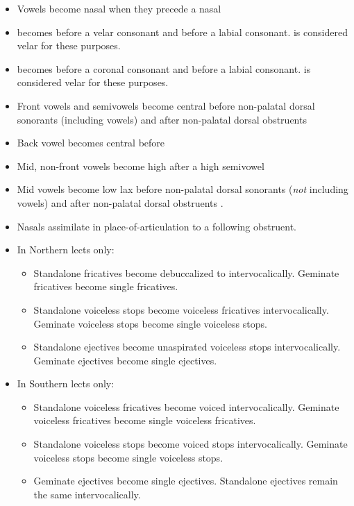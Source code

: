 \documentclass[a4paper,11pt,oneside,openany]{memoir}
\begin{document}
\begin{itemize}
    \item Vowels  become nasal  when they precede a nasal
    \item {} becomes \bripa{\vell} before a velar consonant and \bripa{\bilav\dwnwrd} before a labial consonant.  is considered velar for these purposes.
    \item \phipa{\vell} becomes \bripa{\darkl} before a coronal consonant and  before a labial consonant.  is considered velar for these purposes.
    \item Front vowels and semivowels  become central  before non-palatal dorsal sonorants (including vowels)  and after non-palatal dorsal obstruents 
    \item Back vowel  becomes central \bripa{\sche} before 
    \item Mid, non-front vowels  become high  after a high semivowel 
    \item Mid vowels  become low lax  before non-palatal dorsal sonorants (\emph{not} including vowels)  and after non-palatal dorsal obstruents .
    \item Nasals assimilate in place-of-articulation to a following obstruent.
    \item In Northern lects only:
    \begin{itemize}
        \item Standalone fricatives become debuccalized to  intervocalically. Geminate fricatives become single fricatives.
        \item Standalone voiceless stops become voiceless fricatives intervocalically. Geminate voiceless stops become single voiceless stops.
        \item Standalone ejectives become unaspirated voiceless stops intervocalically. Geminate ejectives become single ejectives.
    \end{itemize}
    \item In Southern lects only:
    \begin{itemize}
        \item Standalone voiceless fricatives become voiced intervocalically. Geminate voiceless fricatives become single voiceless fricatives.
        \item Standalone voiceless stops become voiced stops intervocalically. Geminate voiceless stops become single voiceless stops.
        \item Geminate ejectives become single ejectives. Standalone ejectives remain the same intervocalically.
    \end{itemize}
\end{itemize}
\end{document}
